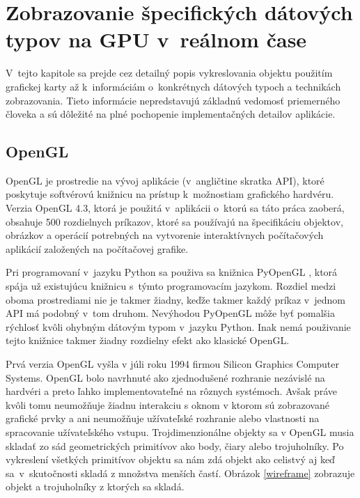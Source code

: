 \chapter{Zobrazovanie špecifických dátových typov na GPU v~reálnom čase}
\label{Teoria}
V~tejto kapitole sa prejde cez detailný popis vykreslovania objektu použitím grafickej karty až k~informáciám o~konkrétnych dátových typoch a technikách zobrazovania. Tieto informácie nepredstavujú základnú vedomosť priemerného človeka a sú dôležité na plné pochopenie implementačných detailov aplikácie.
\section{OpenGL}
OpenGL je prostredie na vývoj aplikácie \cite{OpenGLPG} (v~angličtine skratka API), ktoré poskytuje softvérovú knižnicu na prístup k~možnostiam grafického hardvéru. Verzia OpenGL 4.3, ktorá je použitá v~aplikácii o~ktorú sa táto práca zaoberá, obsahuje 500 rozdielnych príkazov, ktoré sa používajú na špecifikáciu objektov, obrázkov a operácií potrebných na vytvorenie interaktívnych počítačových aplikácií založených na počítačovej grafike.

Pri programovaní v~jazyku Python sa použiva sa knižnica \mbox{PyOpenGL} \cite{PyOpenGL}, ktorá spája už existujúcu knižnicu s~týmto programovacím jazykom. Rozdiel medzi oboma prostrediami nie je takmer žiadny, keďže takmer každý príkaz v~jednom API má podobný v~tom druhom. Nevýhodou PyOpenGL môže byť pomalšia rýchlosť kvôli ohybným dátovým typom v~jazyku Python. Inak nemá použivanie tejto knižnice takmer žiadny rozdielny efekt ako klasické OpenGL.

Prvá verzia OpenGL \cite{OpenGLPG} vyšla v júli roku 1994 firmou Silicon Graphics Computer Systems. OpenGL bolo navrhnuté ako zjednodušené rozhranie nezávislé na hardvéri a preto ľahko implementovateľné na rôznych systémoch. Avšak práve kvôli tomu neumožňuje žiadnu interakciu s oknom v ktorom sú zobrazované grafické prvky a ani neumožňuje užívateľské rozhranie alebo vlastnosti na spracovanie užívateľského vstupu. Trojdimenzionálne objekty sa v OpenGL musia skladať zo sád geometrických primitívov ako body, čiary alebo trojuholníky. Po vykreslení všetkých primitívov objektu sa nám zdá objekt ako celistvý aj keď sa~v~skutočnosti skladá z množstva menších častí. Obrázok \ref{wireframe} zobrazuje objekt a trojuholníky z ktorých sa skladá.



